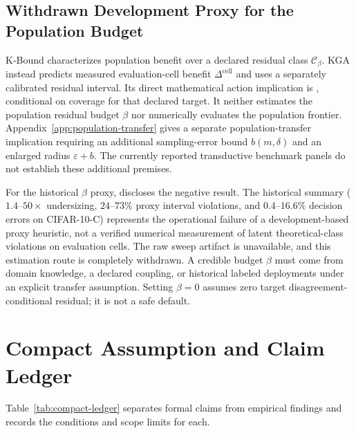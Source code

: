 \subsection{Withdrawn Development Proxy for the Population Budget}
\label{app:withdrawn-beta-proxy}

K-Bound characterizes population benefit over a declared residual class $\mathcal C_\beta$.
KGA instead predicts measured evaluation-cell benefit $\Delta^{\mathrm{cell}}$ and uses a separately
calibrated residual interval. Its direct mathematical action implication is
, conditional on coverage for that declared target.
It neither estimates the population residual budget $\beta$ nor numerically evaluates the population
frontier. Appendix~\ref{app:population-transfer} gives a separate population-transfer implication
requiring an additional sampling-error bound $b(m,\delta)$ and an enlarged radius $\varepsilon+b$.
The currently reported transductive benchmark panels do not establish these additional premises.

For the historical $\beta$ proxy,  discloses the negative result.
The historical summary ($1.4$--$50\times$ undersizing, $24$--$73\%$ proxy interval violations,
and $0.4$--$16.6\%$ decision errors on CIFAR-10-C) represents the operational failure of a development-based
proxy heuristic, not a verified numerical measurement of latent theoretical-class violations on evaluation cells.
The raw sweep artifact is unavailable, and this estimation route is completely withdrawn. A credible
budget $\beta$ must come from domain knowledge, a declared coupling, or historical labeled deployments
under an explicit transfer assumption. Setting $\beta=0$ assumes zero target disagreement-conditional
residual; it is not a safe default.

\section{Compact Assumption and Claim Ledger}
\label{app:compact-ledger}

Table~\ref{tab:compact-ledger} separates formal claims from empirical findings and records the
conditions and scope limits for each.

